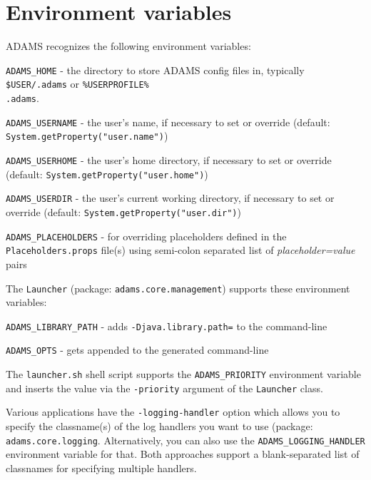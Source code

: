 \section{Environment variables}
ADAMS recognizes the following environment variables:
\begin{tight_itemize}
    \item \texttt{ADAMS\_HOME} - the directory to store ADAMS config files in, typically
    \texttt{\$USER/.adams} or \texttt{\%USERPROFILE\%\\.adams}.
    \item \texttt{ADAMS\_USERNAME} - the user's name, if necessary to set or override
    (default: \texttt{System.getProperty("user.name")})
    \item \texttt{ADAMS\_USERHOME} - the user's home directory, if necessary to set or override
    (default: \texttt{System.getProperty("user.home")})
    \item \texttt{ADAMS\_USERDIR} - the user's current working directory, if necessary to set or override
    (default: \texttt{System.getProperty("user.dir")})
    \item \texttt{ADAMS\_PLACEHOLDERS} - for overriding placeholders defined in the \texttt{Placeholders.props}
    file(s) using semi-colon separated list of \textit{placeholder=value} pairs
\end{tight_itemize}

\noindent The \texttt{Launcher} (package: \texttt{adams.core.management}) supports these
environment variables:
\begin{tight_itemize}
    \item \texttt{ADAMS\_LIBRARY\_PATH} - adds \texttt{-Djava.library.path=} to the command-line
    \item \texttt{ADAMS\_OPTS} - gets appended to the generated command-line
\end{tight_itemize}

\noindent The \texttt{launcher.sh} shell script supports the \texttt{ADAMS\_PRIORITY} environment variable and
inserts the value via the \texttt{-priority} argument of the \texttt{Launcher} class.

\noindent Various applications have the \texttt{-logging-handler} option which allows you to specify the classname(s)
of the log handlers you want to use (package: \texttt{adams.core.logging}.
Alternatively, you can also use the \texttt{ADAMS\_LOGGING\_HANDLER} environment variable for that.
Both approaches support a blank-separated list of classnames for specifying multiple handlers.

